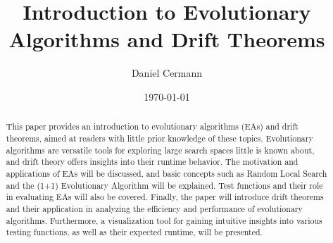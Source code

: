 \documentclass[12pt]{article}
\title{Introduction to Evolutionary Algorithms and Drift Theorems}
\author{Daniel Cermann}
\date{\today}
\begin{document}
\maketitle


\begin{abstract}
    This paper provides an introduction to evolutionary algorithms (EAs) and drift theorems, aimed at readers with little prior knowledge of these topics. Evolutionary algorithms are versatile tools for exploring large search spaces little is known about, and drift theory offers insights into their runtime behavior. The motivation and applications of EAs will be discussed, and basic concepts such as Random Local Search and the (1+1) Evolutionary Algorithm will be explained. Test functions and their role in evaluating EAs will also be covered. Finally, the paper will introduce drift theorems and their application in analyzing the efficiency and performance of evolutionary algorithms. Furthermore, a visualization tool for gaining intuitive insights into various testing functions, as well as their expected runtime, will be presented.
\end{abstract}

\tableofcontents
\newpage


% 








\end{document}
